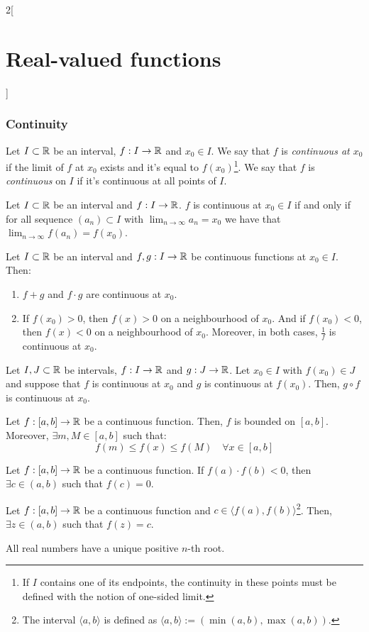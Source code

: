 \documentclass[../../../main.tex]{subfiles}
\begin{document}
\begin{multicols}{2}[\section{Real-valued functions}]
  \subsubsection{Continuity}
  \begin{definition}
    Let $I\subset\mathbb{R}$ be an interval, $f:I\rightarrow\mathbb{R}$ and $x_0\in I$. We say that $f$ is \emph{continuous at $x_0$} if the limit of $f$ at $x_0$ exists and it's equal to $f(x_0)$\footnote{If $I$ contains one of its endpoints, the continuity in these points must be defined with the notion of one-sided limit.}. We say that $f$ is \emph{continuous} on $I$ if it's continuous at all points of $I$.
  \end{definition}
  \begin{lemma}
    Let $I\subset\mathbb{R}$ be an interval and $f:I\rightarrow\mathbb{R}$. $f$ is continuous at $x_0\in I$ if and only if for all sequence $(a_n)\subset I$ with $\displaystyle\lim_{n\to\infty} a_n=x_0$ we have that $\displaystyle\lim_{n\to\infty} f(a_n)=f(x_0)$.
  \end{lemma}
  \begin{proposition}
    Let $I\subset\mathbb{R}$ be an interval and $f,g:I\rightarrow \mathbb{R}$ be continuous functions at $x_0\in I$. Then:
    \begin{enumerate}
      \item $f+g$ and $f\cdot g$ are continuous at $x_0$.
      \item If $f(x_0)>0$, then $f(x)>0$ on a neighbourhood of $x_0$. And if $f(x_0)<0$, then $f(x)<0$ on a neighbourhood of $x_0$. Moreover, in both cases, $\frac{1}{f}$ is continuous at $x_0$.
    \end{enumerate}
  \end{proposition}
  \begin{proposition}
    Let $I,J\subset\mathbb{R}$ be intervals, $f:I\rightarrow\mathbb{R}$ and $g:J\rightarrow\mathbb{R}$. Let $x_0\in I$ with $f(x_0)\in J$ and suppose that $f$ is continuous at $x_0$ and $g$ is continuous at $f(x_0)$. Then, $g\circ f$ is continuous at $x_0$.
  \end{proposition}
  \begin{theorem}
    Let $f:[a,b]\rightarrow\mathbb{R}$ be a continuous function. Then, $f$ is bounded on $[a,b]$. Moreover, $\exists m,M\in[a,b]$ such that: $$f(m)\leq f(x)\leq f(M)\quad\forall x\in [a,b]$$
  \end{theorem}
  \begin{theorem}
    Let $f:[a,b]\rightarrow\mathbb{R}$ be a continuous function. If $f(a)\cdot f(b)<0$, then $\exists c\in(a,b)$ such that $f(c)=0$.
  \end{theorem}
  \begin{corollary}
    Let $f:[a,b]\rightarrow\mathbb{R}$ be a continuous function and $c\in\langle f(a), f(b)\rangle$\footnote{The interval $\langle a,b\rangle$ is defined as $\langle a,b\rangle:=(\min(a,b),\max(a,b))$.}. Then, $\exists z\in (a,b)$ such that $f(z)=c$.
  \end{corollary}
  \begin{corollary}
    All real numbers have a unique positive $n$-th root.
  \end{corollary}

\end{multicols}
\end{document}
